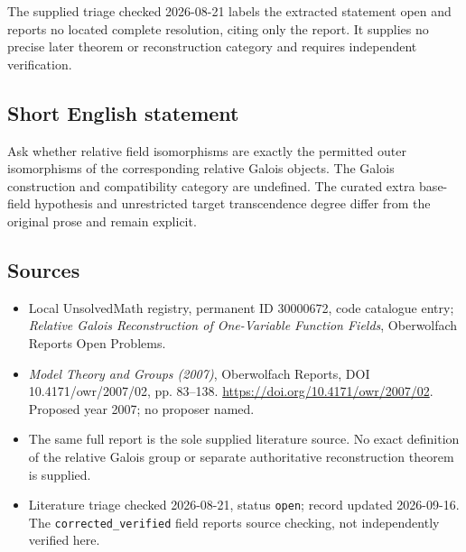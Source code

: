 \documentclass[11pt]{article}
\begin{document}
The supplied triage checked 2026-08-21 labels the extracted statement open and reports no located complete resolution, citing only the report. It supplies no precise later theorem or reconstruction category and requires independent verification.
\subsection{Short English statement}
Ask whether relative field isomorphisms are exactly the permitted outer isomorphisms of the corresponding relative Galois objects. The Galois construction and compatibility category are undefined. The curated extra base-field hypothesis and unrestricted target transcendence degree differ from the original prose and remain explicit.
\subsection{Sources}
\begin{itemize}\item Local UnsolvedMath registry, permanent ID 30000672, code catalogue entry; \emph{Relative Galois Reconstruction of One-Variable Function Fields}, Oberwolfach Reports Open Problems.\item \emph{Model Theory and Groups (2007)}, Oberwolfach Reports, DOI 10.4171/owr/2007/02, pp. 83--138. \url{https://doi.org/10.4171/owr/2007/02}. Proposed year 2007; no proposer named.\item The same full report is the sole supplied literature source. No exact definition of the relative Galois group or separate authoritative reconstruction theorem is supplied.\item Literature triage checked 2026-08-21, status \texttt{open}; record updated 2026-09-16. The \texttt{corrected\_verified} field reports source checking, not independently verified here.\end{itemize}
\end{document}

